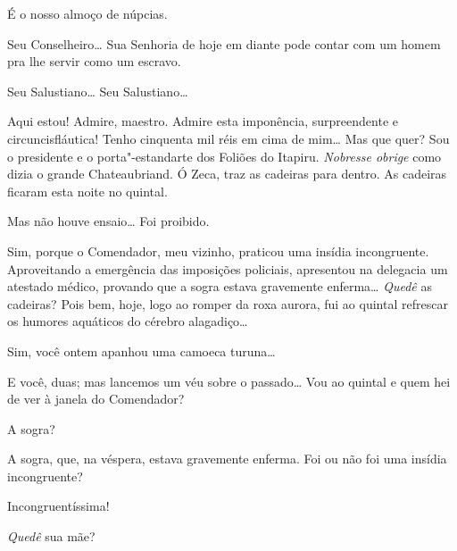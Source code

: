 \begin{linenumbers}
 É o nosso almoço de núpcias. 

 Seu Conselheiro\ldots{} Sua Senhoria de hoje em diante pode contar
com um homem pra lhe servir como um escravo. 







 Seu Salustiano\ldots{} Seu Salustiano\ldots{} 

 Aqui estou! Admire, maestro. Admire esta imponência,
surpreendente e circuncisfláutica! Tenho cinquenta mil réis em cima de mim\ldots{} 
Mas que quer? Sou o presidente e o porta"-estandarte dos Foliões do
Itapiru. \textit{Nobresse obrige} como dizia o grande
Chateaubriand.  Ó Zeca, traz as cadeiras para dentro.  As cadeiras ficaram esta noite no quintal.

 Mas não houve ensaio\ldots{}  Foi proibido.

 Sim, porque o Comendador, meu vizinho, praticou uma
insídia incongruente.  Aproveitando a emergência das imposições policiais,
apresentou na delegacia um atestado médico, provando que a sogra estava
gravemente enferma\ldots{}  \textit{Quedê} as
cadeiras? 
  Pois bem, hoje, logo ao romper
da roxa aurora, fui ao quintal refrescar os humores aquáticos do cérebro
alagadiço\ldots{}

 Sim, você ontem apanhou uma camoeca turuna\ldots{}

 E você, duas; mas lancemos um véu sobre o passado\ldots{} Vou ao
quintal e quem hei de ver à janela do Comendador?

 A sogra?

 A sogra, que, na véspera, estava gravemente enferma. Foi
ou não foi uma insídia incongruente?

 Incongruentíssima!

  \textit{Quedê} sua mãe?


\end{linenumbers}
